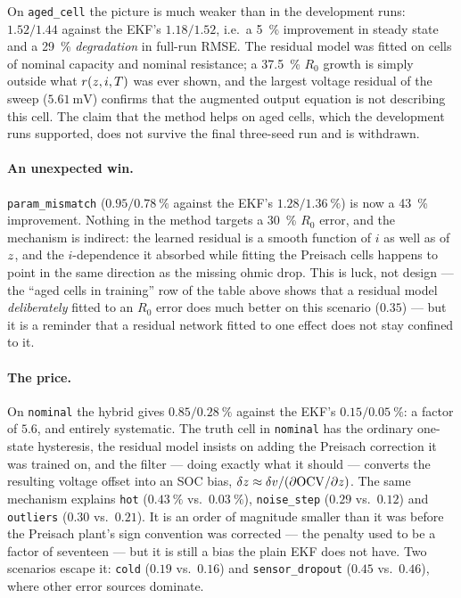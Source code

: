 On \texttt{aged\_cell} the picture is much weaker than in the development runs: $1.52/1.44$ against
the EKF's $1.18/1.52$, i.e.\ a \SI{5}{\percent} improvement in steady state and a \SI{29}{\percent}
\emph{degradation} in full-run RMSE.  The residual model was fitted on cells of nominal capacity
and nominal resistance; a \SI{37.5}{\percent} $R_0$ growth is simply outside what
$r(z,i,T)$ was ever shown, and the largest voltage residual of the sweep
($\SI{5.61}{\milli\volt}$) confirms that the augmented output equation is not describing this cell.
The claim that the method helps on aged cells, which the development runs supported, does not
survive the final three-seed run and is withdrawn.

\paragraph{An unexpected win.}  \texttt{param\_mismatch} ($0.95/\SI{0.78}{\percent}$ against the
EKF's $1.28/\SI{1.36}{\percent}$) is now a \SI{43}{\percent} improvement.  Nothing in the method
targets a \SI{30}{\percent} $R_0$ error, and the mechanism is indirect: the learned residual is a
smooth function of $i$ as well as of $z$, and the $i$-dependence it absorbed while fitting the
Preisach cells happens to point in the same direction as the missing ohmic drop.  This is luck, not
design --- the ``aged cells in training'' row of the table above shows that a residual model
\emph{deliberately} fitted to an $R_0$ error does much better on this scenario ($0.35$) --- but it
is a reminder that a residual network fitted to one effect does not stay confined to it.

\paragraph{The price.}  On \texttt{nominal} the hybrid gives $0.85/\SI{0.28}{\percent}$ against the
EKF's $0.15/\SI{0.05}{\percent}$: a factor of $5.6$, and entirely systematic.  The truth cell in
\texttt{nominal} has the ordinary one-state hysteresis, the residual model insists on adding the
Preisach correction it was trained on, and the filter --- doing exactly what it should --- converts
the resulting voltage offset into an SOC bias, $\delta z \approx
\delta v/(\partial\mathrm{OCV}/\partial z)$.  The same mechanism explains \texttt{hot}
($\SI{0.43}{\percent}$ vs.\ $\SI{0.03}{\percent}$), \texttt{noise\_step} ($0.29$ vs.\ $0.12$) and
\texttt{outliers} ($0.30$ vs.\ $0.21$).  It is an order of magnitude smaller than it was before the
Preisach plant's sign convention was corrected --- the penalty used to be a factor of seventeen ---
but it is still a bias the plain EKF does not have.  Two scenarios escape it: \texttt{cold}
($0.19$ vs.\ $0.16$) and \texttt{sensor\_dropout} ($0.45$ vs.\ $0.46$), where other error sources
dominate.

